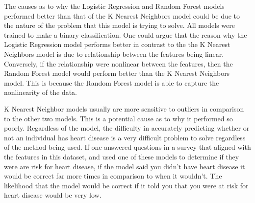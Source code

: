 The causes as to why the Logistic Regression and Random Forest models performed better than that of the K Nearest Neighbors model could be due to the nature of the problem that this model is trying to solve. All models were trained to make
a binary classification. One could argue that the reason why the Logistic Regression model performs better in contrast to the the K Nearest Neighbors model is due to relationship between the features being linear. Conversely, if the relationship
were nonlinear between the features, then the Random Forest model would perform better than the K Nearest Neighbors model. This is because the Random Forest model is able to capture the nonlinearity of the data.

K Nearest Neighbor models usually are more sensitive to outliers in comparison to the other two models. This is a potential cause as to why it performed so poorly. Regardless of the model, the difficulty in accurately predicting whether or not
an individual has heart disease is a very difficult problem to solve regardless of the method being used. If one answered questions in a survey that aligned with the features in this dataset, and used one of these models to determine if they
were are risk for heart disease, if the model said you didn't have heart disease it would be correct far more times in comparison to when it wouldn't. The likelihood that the model would be correct if it told you that you were at risk for
heart disease would be very low.


\clearpage

